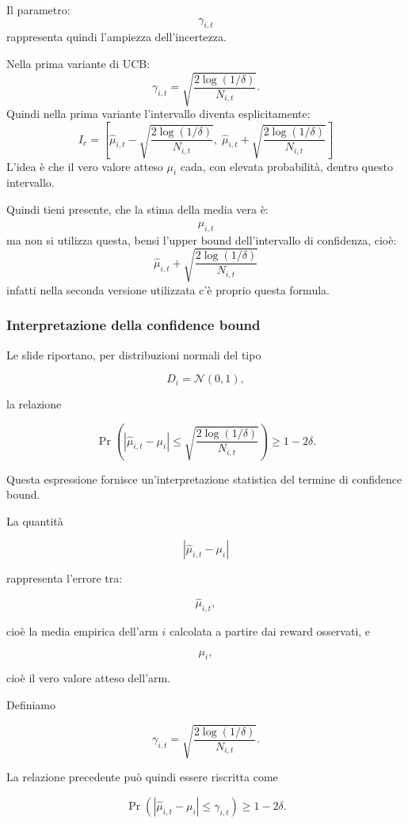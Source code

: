 Il parametro:
\[
\gamma_{i,t}
\]
rappresenta quindi l'ampiezza dell'incertezza.

Nella prima variante di UCB:
\[
\gamma_{i,t}
=
\sqrt{
\frac{
2\log(1/\delta)
}{
N_{i,t}
}
}.
\]
Quindi nella prima variante l'intervallo diventa esplicitamente:
\[
\boxed{
I_c
=
\left[
\widehat{\mu}_{i,t}
-
\sqrt{\frac{2\log(1/\delta)}{N_{i,t}}},
\;
\widehat{\mu}_{i,t}
+
\sqrt{\frac{2\log(1/\delta)}{N_{i,t}}}
\right]
}
\]
L'idea è che il vero valore atteso \(\mu_i\) cada, con elevata probabilità, dentro questo intervallo.

Quindi tieni presente, che la stima della media vera è:
\[
\widehat{\mu_{i,t}}
\]
ma non si utilizza questa, bensi l'upper bound dell'intervallo di confidenza, cioè:
\[
\widehat{\mu}_{i,t}
+
\sqrt{\frac{2\log(1/\delta)}{N_{i,t}}}
\]
infatti nella seconda versione utilizzata c'è proprio questa formula.

\subsubsection{Interpretazione della confidence bound}

Le slide riportano, per distribuzioni normali del tipo

\[
D_i=\mathcal{N}(0,1),
\]

la relazione

\[
\Pr\left(
\left|
\widehat{\mu}_{i,t}-\mu_i
\right|
\le
\sqrt{
\frac{2\log(1/\delta)}
{N_{i,t}}
}
\right)
\ge
1-2\delta.
\]

Questa espressione fornisce un'interpretazione statistica del termine di confidence bound.

La quantità

\[
\left|
\widehat{\mu}_{i,t}-\mu_i
\right|
\]

rappresenta l'errore tra:

\[
\widehat{\mu}_{i,t},
\]

cioè la media empirica dell'arm $i$ calcolata a partire dai reward osservati, e

\[
\mu_i,
\]

cioè il vero valore atteso dell'arm.

Definiamo

\[
\gamma_{i,t}
=
\sqrt{
\frac{2\log(1/\delta)}
{N_{i,t}}
}.
\]

La relazione precedente può quindi essere riscritta come

\[
\Pr\left(
\left|
\widehat{\mu}_{i,t}-\mu_i
\right|
\le
\gamma_{i,t}
\right)
\ge
1-2\delta.
\]


